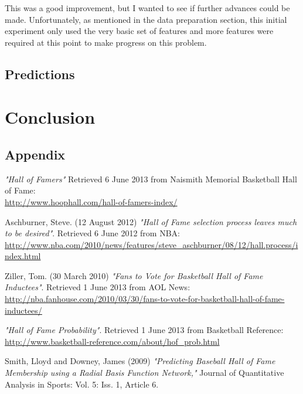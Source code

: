 \documentclass[paper=a4, fontsize=11pt]{scrartcl} %
\numberwithin{equation}{section} %
\numberwithin{figure}{section} %
\numberwithin{table}{section} %
\begin{document}
This was a good improvement, but I wanted to see if further advances could be made. Unfortunately, as mentioned in the data preparation section, this initial experiment only used the very basic set of features and more features were required at this point to make progress on this problem. 

\subsection{Predictions}

\section{Conclusion}

\begin{appendix}
\section{Appendix}

\end{appendix}

\begin{thebibliography}{9}

	\emph{"Hall of Famers"}
	Retrieved 6 June 2013 from Naismith Memorial Basketball Hall of Fame:\\
	\url{http://www.hoophall.com/hall-of-famers-index/} 

Aschburner, Steve. (12 August 2012)
\emph{"Hall of Fame selection process leaves much to be desired"}.
Retrieved 6 June 2012 from NBA:
\url{http://www.nba.com/2010/news/features/steve_aschburner/08/12/hall.process/index.html}   

   Ziller, Tom. (30 March 2010)
  \emph{"Fans to Vote for Basketball Hall of Fame Inductees"}.
   Retrieved 1 June 2013 from AOL News:
   \url{http://nba.fanhouse.com/2010/03/30/fans-to-vote-for-basketball-hall-of-fame-inductees/}
   
  \emph{"Hall of Fame Probability"}.
   Retrieved 1 June 2013 from Basketball Reference:\\
   \url{http://www.basketball-reference.com/about/hof_prob.html}  
 
Smith, Lloyd and Downey, James (2009)
\emph{"Predicting Baseball Hall of Fame Membership using a Radial Basis Function Network,"}
Journal of Quantitative Analysis in Sports: Vol. 5: Iss. 1, Article 6.
 
\end{thebibliography}
\end{document}
